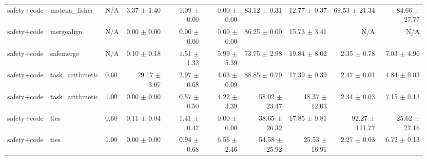 \begin{table}[H]
{\begin{tabular}{lllrrrrrrr}
safety+code & matena\_fisher & N/A & 3.37 $\pm$ 1.40 & 1.09 $\pm$ 0.00 & 0.00 $\pm$ 0.00 & 83.12 $\pm$ 0.31 & 12.77 $\pm$ 0.37 & 69.53 $\pm$ 21.34 & 84.66 $\pm$ 27.77 \\
safety+code & mergealign & N/A & 0.00 $\pm$ 0.00 & 0.00 $\pm$ 0.00 & 0.00 $\pm$ 0.00 & 86.25 $\pm$ 0.00 & 15.73 $\pm$ 3.41 & N/A & N/A \\
safety+code & safemerge & N/A & 0.10 $\pm$ 0.18 & 1.51 $\pm$ 1.33 & 5.99 $\pm$ 5.39 & 73.75 $\pm$ 2.98 & 19.84 $\pm$ 8.02 & 2.35 $\pm$ 0.78 & 7.03 $\pm$ 4.96 \\
safety+code & task\_arithmetic & 0.60 & 29.17 $\pm$ 3.07 & 2.97 $\pm$ 0.68 & 4.63 $\pm$ 0.09 & 88.85 $\pm$ 0.79 & 17.39 $\pm$ 0.39 & 2.47 $\pm$ 0.01 & 4.84 $\pm$ 0.03 \\
safety+code & task\_arithmetic & 1.00 & 0.00 $\pm$ 0.00 & 0.57 $\pm$ 0.50 & 4.22 $\pm$ 3.39 & 58.02 $\pm$ 23.47 & 18.37 $\pm$ 12.03 & 2.34 $\pm$ 0.03 & 7.15 $\pm$ 0.13 \\
safety+code & ties & 0.60 & 0.11 $\pm$ 0.04 & 1.41 $\pm$ 0.47 & 0.00 $\pm$ 0.00 & 38.65 $\pm$ 26.32 & 17.85 $\pm$ 9.81 & 92.27 $\pm$ 111.77 & 25.62 $\pm$ 27.16 \\
safety+code & ties & 1.00 & 0.00 $\pm$ 0.00 & 0.94 $\pm$ 0.68 & 6.56 $\pm$ 2.46 & 54.58 $\pm$ 25.92 & 25.53 $\pm$ 16.91 & 2.27 $\pm$ 0.03 & 6.72 $\pm$ 0.13 \\
\bottomrule
\end{tabular}
}
\end{table}


\begin{table}[H]
\centering
\caption{メイン実験 シード別詳細 - Method: task\_arithmetic, Pattern: safety+code}
\label{tab:main_seeds_taskarithmetic_safety_code}
\small
{}
\end{table}


